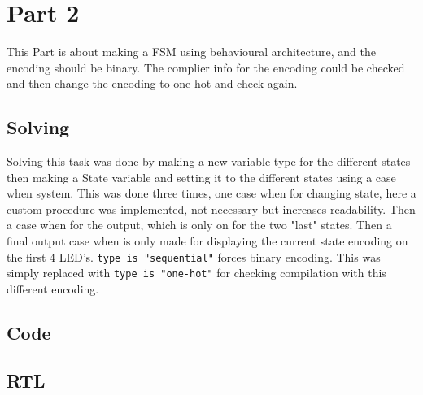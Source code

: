 \documentclass{article}
\begin{document}
\section{Part 2}
This Part is about making a FSM using behavioural architecture, and the encoding should be binary. The complier info for the encoding could be checked and then change the encoding to one-hot and check again.

\subsection{Solving}
Solving this task was done by making a new variable type for the different states then making a State variable and setting it to the different states using a case when system. This was done three times, one case when for changing state, here a custom procedure was implemented, not necessary but increases readability. Then a case when for the output, which is only on for the two "last" states. Then a final output case when is only made for displaying the current state encoding on the first 4 LED's. \verb|type is "sequential"| forces binary encoding. This was simply replaced with \verb|type is "one-hot"| for checking compilation with this different encoding.

\subsection{Code}

\clearpage
\subsection{RTL}
\end{document}
